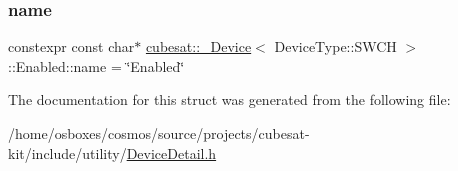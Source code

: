 \subsubsection{\texorpdfstring{name}{name}}
{\footnotesize\ttfamily constexpr const char$\ast$ \hyperlink{structcubesat_1_1__Device}{cubesat\+::\+\_\+\+Device}$<$ Device\+Type\+::\+S\+W\+CH $>$\+::Enabled\+::name = \char`\"{}Enabled\char`\"{}\hspace{0.3cm}{\ttfamily [static]}}



The documentation for this struct was generated from the following file\+:\begin{DoxyCompactItemize}
\item 
/home/osboxes/cosmos/source/projects/cubesat-\/kit/include/utility/\hyperlink{DeviceDetail_8h}{Device\+Detail.\+h}\end{DoxyCompactItemize}
